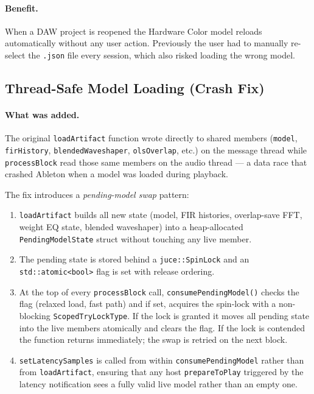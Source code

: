 \documentclass[11pt, letterpaper]{article}
\begin{document}
\paragraph{Benefit.}
When a DAW project is reopened the Hardware Color model reloads automatically
without any user action.  Previously the user had to manually re-select the
\texttt{.json} file every session, which also risked loading the wrong model.

\subsection{Thread-Safe Model Loading (Crash Fix)}

\paragraph{What was added.}
The original \texttt{loadArtifact} function wrote directly to shared members
(\texttt{model}, \texttt{firHistory}, \texttt{blendedWaveshaper},
\texttt{olsOverlap}, etc.) on the message thread while \texttt{processBlock}
read those same members on the audio thread — a data race that crashed Ableton
when a model was loaded during playback.

The fix introduces a \emph{pending-model swap} pattern:
\begin{enumerate}[leftmargin=1.5em]
    \item \texttt{loadArtifact} builds all new state (model, FIR histories,
          overlap-save FFT, weight EQ state, blended waveshaper) into a
          heap-allocated \texttt{PendingModelState} struct without touching any
          live member.
    \item The pending state is stored behind a \texttt{juce::SpinLock} and an
          \texttt{std::atomic<bool>} flag is set with release ordering.
    \item At the top of every \texttt{processBlock} call,
          \texttt{consumePendingModel()} checks the flag (relaxed load, fast
          path) and if set, acquires the spin-lock with a non-blocking
          \texttt{ScopedTryLockType}.  If the lock is granted it moves all
          pending state into the live members atomically and clears the flag.
          If the lock is contended the function returns immediately; the swap
          is retried on the next block.
    \item \texttt{setLatencySamples} is called from within
          \texttt{consumePendingModel} rather than from \texttt{loadArtifact},
          ensuring that any host \texttt{prepareToPlay} triggered by the
          latency notification sees a fully valid live model rather than an
          empty one.
\end{enumerate}
\end{document}
